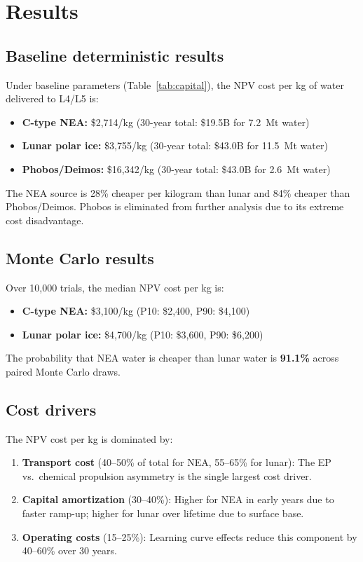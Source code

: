\documentclass[preprint,12pt]{elsarticle}
\begin{document}
\section{Results}
\label{sec:results}

\subsection{Baseline deterministic results}

Under baseline parameters (Table~\ref{tab:capital}), the NPV cost per kg of water delivered to L4/L5 is:
\begin{itemize}
    \item \textbf{C-type NEA:} \$2,714/kg (30-year total: \$19.5B for 7.2~Mt water)
    \item \textbf{Lunar polar ice:} \$3,755/kg (30-year total: \$43.0B for 11.5~Mt water)
    \item \textbf{Phobos/Deimos:} \$16,342/kg (30-year total: \$43.0B for 2.6~Mt water)
\end{itemize}

The NEA source is 28\% cheaper per kilogram than lunar and 84\% cheaper than Phobos/Deimos. Phobos is eliminated from further analysis due to its extreme cost disadvantage.

\subsection{Monte Carlo results}

Over 10,000 trials, the median NPV cost per kg is:
\begin{itemize}
    \item \textbf{C-type NEA:} \$3,100/kg (P10: \$2,400, P90: \$4,100)
    \item \textbf{Lunar polar ice:} \$4,700/kg (P10: \$3,600, P90: \$6,200)
\end{itemize}

The probability that NEA water is cheaper than lunar water is \textbf{91.1\%} across paired Monte Carlo draws.

\subsection{Cost drivers}

The NPV cost per kg is dominated by:
\begin{enumerate}
    \item \textbf{Transport cost} (40--50\% of total for NEA, 55--65\% for lunar): The EP vs.\ chemical propulsion asymmetry is the single largest cost driver.
    \item \textbf{Capital amortization} (30--40\%): Higher for NEA in early years due to faster ramp-up; higher for lunar over lifetime due to surface base.
    \item \textbf{Operating costs} (15--25\%): Learning curve effects reduce this component by 40--60\% over 30 years.
\end{enumerate}
\end{document}
